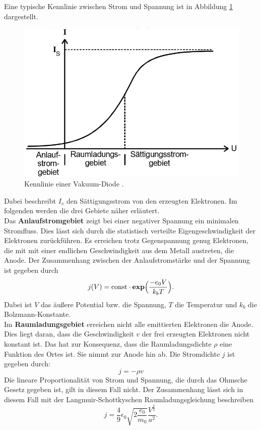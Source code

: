 Eine typische Kennlinie zwischen Strom und Spannung ist in Abbildung \ref{abb:3} dargestellt.
\begin{figure}[H]
  \centering
  \includegraphics[width=10 cm , height= 5 cm]{content/Kennlinie.png}
  \caption{Kennlinie einer Vakuum-Diode \cite{1}.}
  \label{abb:3}
\end{figure}
Dabei beschreibt $I_s$ den Sättigungsstrom von den erzeugten Elektronen.
Im folgenden werden die drei Gebiete näher erläutert.\\
Das \textbf{Anlaufstromgebiet} zeigt bei einer negativer Spannung ein minimalen Stromfluss. Dies lässt sich durch die
statistisch verteilte Eigengeschwindigkeit der Elektronen zurückführen. Es erreichen trotz Gegenspannung
genug Elektronen, die mit mit einer endlichen Geschwindigkeit aus dem Metall austreten, die Anode.
Der Zusammenhang zwischen der Anlaufstromstärke und der Spannung ist gegeben durch
\begin{equation}
  j(V) = \text{const} \cdot \textbf{exp}\Bigl(\frac{-e_0 V}{k_b T}\Bigr).
  \label{eq:1}
\end{equation}
Dabei ist $V$ das äußere Potential bzw. die Spannung, $T$ die Temperatur und $k_b$ die Bolzmann-Konstante.\\
Im \textbf{Raumladungsgebiet} erreichen nicht alle emittierten Elektronen die Anode.
Dies liegt daran, dass die Geschwindigkeit $v$ der frei erzeugten Elektronen nicht konstant ist. Das hat zur
Konsequenz, dass die Raumladungsdichte $\rho$ eine Funktion des Ortes ist. Sie nimmt zur Anode hin ab.
Die Stromdichte $j$ ist gegeben durch:
\begin{equation*}
  j = -\rho v
\end{equation*}
Die lineare Proportionalität von Strom und Spannung, die durch das
Ohmsche Gesetz gegeben ist, gilt in diesem Fall nicht. Der Zusammenhang lässt sich in diesem Fall mit der Langmuir-Schottkyschen Raumladungsgleichung
beschreiben
\begin{equation}
  j = \frac{4}{9} \epsilon_0 \sqrt{2\frac{e_0}{m_0}} \frac{V^\frac{3}{2}}{a^2}.
  \label{eq:2}
\end{equation}
